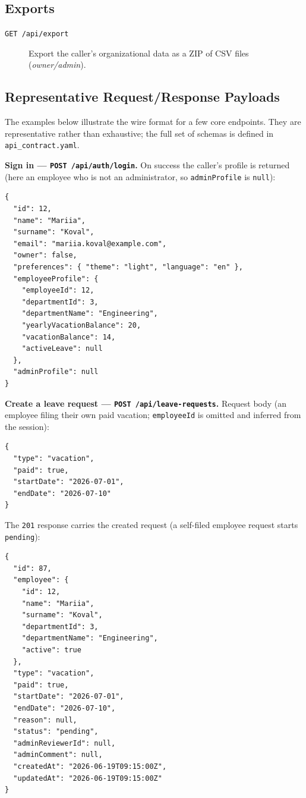 \documentclass[11pt,a4paper]{article}
\begin{document}
\subsection{Exports}
\begin{description}
    \item[\texttt{GET /api/export}] Export the caller's organizational data as a ZIP of CSV files (\textit{owner/admin}).
\end{description}

\subsection{Representative Request/Response Payloads}
\label{sec:api-examples}

The examples below illustrate the wire format for a few core endpoints. They are
representative rather than exhaustive; the full set of schemas is defined in
\texttt{api\_contract.yaml}.

\textbf{Sign in --- \texttt{POST /api/auth/login}.} On success the caller's profile is returned
(here an employee who is not an administrator, so \texttt{adminProfile} is \texttt{null}):

\begin{lstlisting}[style=json]
{
  "id": 12,
  "name": "Mariia",
  "surname": "Koval",
  "email": "mariia.koval@example.com",
  "owner": false,
  "preferences": { "theme": "light", "language": "en" },
  "employeeProfile": {
    "employeeId": 12,
    "departmentId": 3,
    "departmentName": "Engineering",
    "yearlyVacationBalance": 20,
    "vacationBalance": 14,
    "activeLeave": null
  },
  "adminProfile": null
}
\end{lstlisting}

\textbf{Create a leave request --- \texttt{POST /api/leave-requests}.} Request body (an employee
filing their own paid vacation; \texttt{employeeId} is omitted and inferred from the session):

\begin{lstlisting}[style=json]
{
  "type": "vacation",
  "paid": true,
  "startDate": "2026-07-01",
  "endDate": "2026-07-10"
}
\end{lstlisting}

\noindent The \texttt{201} response carries the created request (a self-filed employee request
starts \texttt{pending}):

\begin{lstlisting}[style=json]
{
  "id": 87,
  "employee": {
    "id": 12,
    "name": "Mariia",
    "surname": "Koval",
    "departmentId": 3,
    "departmentName": "Engineering",
    "active": true
  },
  "type": "vacation",
  "paid": true,
  "startDate": "2026-07-01",
  "endDate": "2026-07-10",
  "reason": null,
  "status": "pending",
  "adminReviewerId": null,
  "adminComment": null,
  "createdAt": "2026-06-19T09:15:00Z",
  "updatedAt": "2026-06-19T09:15:00Z"
}
\end{lstlisting}
\end{document}
